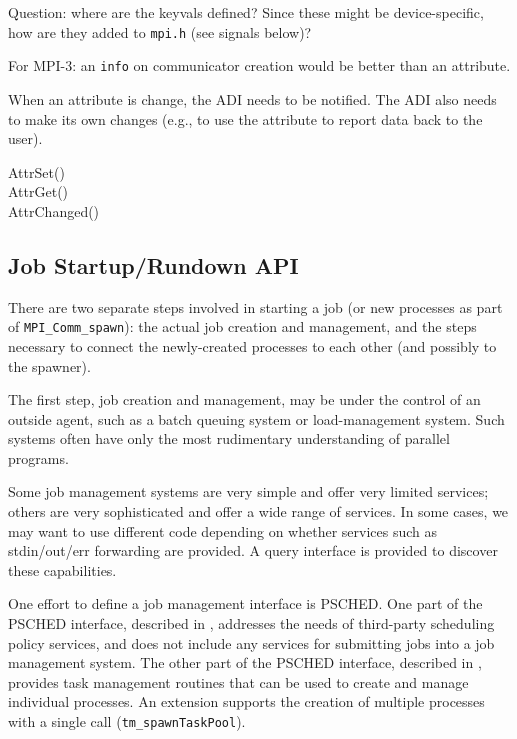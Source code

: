 \documentclass{article}
\let\file=\texttt
\let\code=\texttt
\begin{document}
Question: where are the keyvals defined?  Since these might be
device-specific, how are they added to \file{mpi.h} (see signals below)?  

For MPI-3: an \code{info} on communicator creation would be better than an
attribute. 

When an attribute is change, the ADI needs to be notified.  The ADI also needs
to make its own changes (e.g., to use the attribute to report data back to the
user).

\begin{description}
\item[AttrSet()]
\item[AttrGet()]
\item[AttrChanged()]
\end{description}

\subsection{Job Startup/Rundown API}

There are two separate steps involved in starting a job (or new processes as
part of \code{MPI\_Comm\_spawn}): the actual job creation and management, and
the steps necessary to connect the newly-created processes to each other (and
possibly to the spawner).  

The first step, job creation and management, may be under the control of an
outside agent, such as a batch queuing system or load-management system.  Such
systems often have only the most rudimentary understanding of parallel
programs.

Some job management systems are very simple and offer very limited
services; others are very sophisticated and offer a wide range of services.
In some cases, we may want to use different code depending on whether services
such as stdin/out/err forwarding are provided.  A query interface is provided
to discover these capabilities.

One effort to define a job management interface is PSCHED.
One part of the PSCHED interface, described in \cite{psched01}, addresses the
needs of third-party scheduling 
policy services, and does not include any services for submitting jobs into a
job management system.  
The other part of the PSCHED interface, described in \cite{psched01other},
provides task management routines that can be used to create and manage
individual processes.  An extension supports the creation of multiple
processes with a single call (\code{tm\_spawnTaskPool}).  
\end{document}

